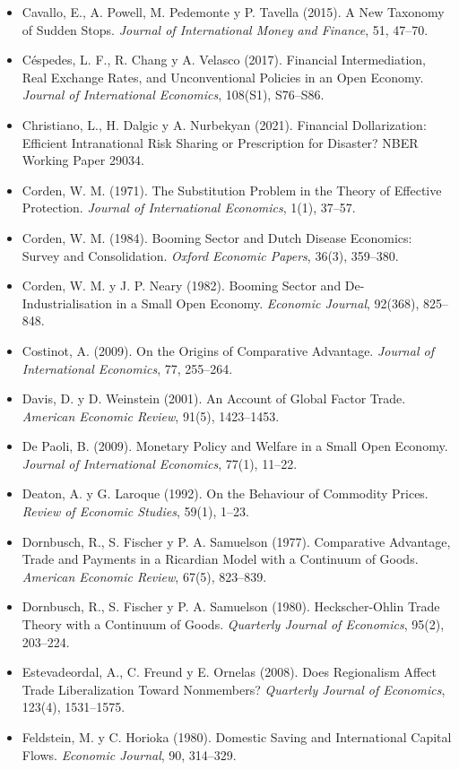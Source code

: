 \documentclass[11pt,a4paper]{article}
\begin{document}
{\begin{itemize}[leftmargin=1.4em,itemsep=1pt,label={}]
\item Cavallo, E., A. Powell, M. Pedemonte y P. Tavella (2015). A New Taxonomy of Sudden Stops. \emph{Journal of International Money and Finance}, 51, 47--70.
\item Céspedes, L. F., R. Chang y A. Velasco (2017). Financial Intermediation, Real Exchange Rates, and Unconventional Policies in an Open Economy. \emph{Journal of International Economics}, 108(S1), S76--S86.
\item Christiano, L., H. Dalgic y A. Nurbekyan (2021). Financial Dollarization: Efficient Intranational Risk Sharing or Prescription for Disaster? NBER Working Paper 29034.
\item Corden, W. M. (1971). The Substitution Problem in the Theory of Effective Protection. \emph{Journal of International Economics}, 1(1), 37--57.
\item Corden, W. M. (1984). Booming Sector and Dutch Disease Economics: Survey and Consolidation. \emph{Oxford Economic Papers}, 36(3), 359--380.
\item Corden, W. M. y J. P. Neary (1982). Booming Sector and De-Industrialisation in a Small Open Economy. \emph{Economic Journal}, 92(368), 825--848.
\item Costinot, A. (2009). On the Origins of Comparative Advantage. \emph{Journal of International Economics}, 77, 255--264.
\item Davis, D. y D. Weinstein (2001). An Account of Global Factor Trade. \emph{American Economic Review}, 91(5), 1423--1453.
\item De Paoli, B. (2009). Monetary Policy and Welfare in a Small Open Economy. \emph{Journal of International Economics}, 77(1), 11--22.
\item Deaton, A. y G. Laroque (1992). On the Behaviour of Commodity Prices. \emph{Review of Economic Studies}, 59(1), 1--23.
\item Dornbusch, R., S. Fischer y P. A. Samuelson (1977). Comparative Advantage, Trade and Payments in a Ricardian Model with a Continuum of Goods. \emph{American Economic Review}, 67(5), 823--839.
\item Dornbusch, R., S. Fischer y P. A. Samuelson (1980). Heckscher-Ohlin Trade Theory with a Continuum of Goods. \emph{Quarterly Journal of Economics}, 95(2), 203--224.
\item Estevadeordal, A., C. Freund y E. Ornelas (2008). Does Regionalism Affect Trade Liberalization Toward Nonmembers? \emph{Quarterly Journal of Economics}, 123(4), 1531--1575.
\item Feldstein, M. y C. Horioka (1980). Domestic Saving and International Capital Flows. \emph{Economic Journal}, 90, 314--329.

\end{itemize}}
\end{document}
